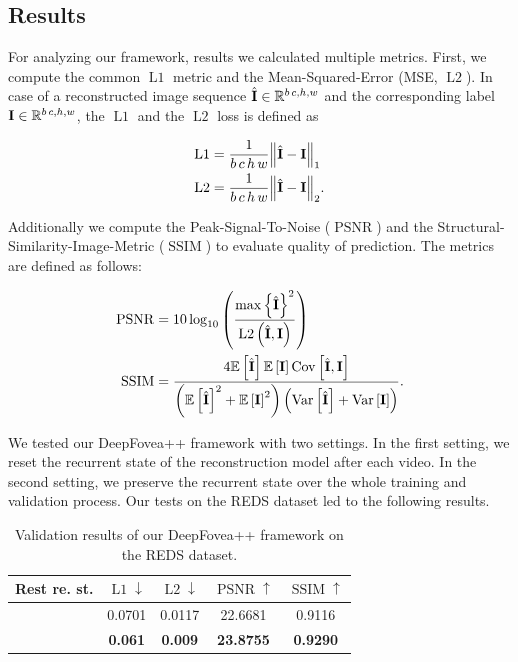 \documentclass[10pt,twocolumn,letterpaper]{article}
\newcommand{\cmark}{\ding{51}}
\newcommand{\xmark}{\ding{55}}
\newcommand{\Tensor}[1]{\boldsymbol{\mathrm{\MakeUppercase{#1}}}}
\newcommand{\Set}[1]{\mathbb{#1}}
\newcommand{\Mean}[1]{\mathbb{E}\left[#1\right]}
\newcommand{\Var}[1]{\mathrm{Var}\left[#1\right]}
\newcommand{\Cov}[1]{\mathrm{Cov}\left[#1\right]}
\begin{document}
	\subsection{Results} \label{subsec:results}
	For analyzing our framework, results we calculated multiple metrics. First, we compute the common $\operatorname{L1}$ metric and the Mean-Squared-Error (MSE, $\operatorname{L2}$). In case of a reconstructed image sequence $\hat{\Tensor{I}}\in\Set{R}^{b\,c, h, w}$ and the corresponding label $\Tensor{I}\in\Set{R}^{b\,c, h, w}$, the $\operatorname{L1}$ and the $\operatorname{L2}$ loss is defined as
	
	\begin{align}
	\operatorname{L1} &= \frac{1}{b\,c\, h\, w}\norm{\hat{\Tensor{I}} - \Tensor{I}}_{1}\\
	\operatorname{L2} &= \frac{1}{b\,c\, h\, w}\norm{\hat{\Tensor{I}} - \Tensor{I}}_{2}.
	\end{align}
	
	Additionally we compute the Peak-Signal-To-Noise ($\operatorname{PSNR}$) and the Structural-Similarity-Image-Metric ($\operatorname{SSIM}$) \cite{ssmi} to evaluate quality of prediction. The metrics are defined as follows:
	
	\begin{align}
	\operatorname{PSNR}&=10 \log_{10}\left(\frac{\max\left\{\hat{\Tensor{I}}\right\}^2}{\operatorname{L2}\left(\hat{\Tensor{I}}, \Tensor{I}\right)} \right)\\
	\operatorname{SSIM}&=\frac{4\Mean{\hat{\Tensor{I}}}\Mean{\Tensor{I}}\Cov{\hat{\Tensor{I}}, \Tensor{I}}}{\left(\Mean{\hat{\Tensor{I}}}^2 + \Mean{\Tensor{I}}^2\right)\left(\Var{\hat{\Tensor{I}}} + \Var{\Tensor{I}}\right)}.
	\end{align}
	
	We tested our DeepFovea++ framework with two settings. In the first setting, we reset the recurrent state of the reconstruction model after each video. In the second setting, we preserve the recurrent state over the whole training and validation process. Our tests on the REDS dataset \cite{REDS} led to the following results.\\
	
	\begin{table}[!htbp]
		\centering
		\begin{center}
			\begin{tabular}{c|c|c|c|c}
				Rest re. st. & $\operatorname{L1}\downarrow$ & $\operatorname{L2}\downarrow$ & $\operatorname{PSNR}\uparrow$ & $\operatorname{SSIM}\uparrow$ \\ 
				\hline 
				\cmark & 0.0701 & 0.0117 & 22.6681 & 0.9116 \\
				\xmark & {\bf 0.061} & {\bf 0.009} & {\bf 23.8755} & {\bf 0.9290} \\ 
				\hline 
			\end{tabular} 
		\end{center}
		\caption{Validation results of our DeepFovea++ framework on the REDS dataset.}
		\label{tab:results}
	\end{table}
	
\end{document}
